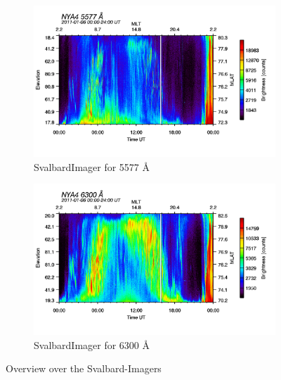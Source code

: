 \documentclass[10pt,a4paper]{article}
\begin{document}
\begin{figure}[h]
\centering
\begin{subfigure}{0.45\textwidth}
\centering
	\includegraphics[width=\textwidth]{SvalbardImager5577A.png}
	\caption{ SvalbardImager for 5577 \AA{} \label{SBI_5_overview}}
\end{subfigure}
\begin{subfigure}{0.45\textwidth}
\centering
	\includegraphics[width=\textwidth]{SvalbardImager6300A.png}
	\caption{ SvalbardImager for 6300 \AA{} \label{SBI_6_overview}}
\end{subfigure}
\caption{Overview over the Svalbard-Imagers}
\label{SBI_all_overview}
\end{figure}
\end{document}
